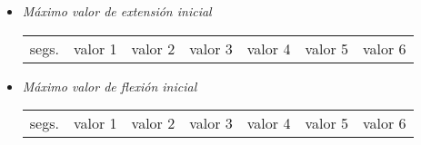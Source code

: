 \begin{itemize} [label=$ \rhd $]
\begin{itemize} [label= $  \triangleright $]
\begin{table}[H]
\begin{tabular}{ccccccc}
			\end{tabular} 
		\end{table}	
		\item \textit{Máximo valor de extensión inicial} \vspace{-6mm}
		\begin{table}[H]
			\hspace{2cm}
			\renewcommand{\arraystretch}{2}
			\begin{tabular}{ccccccc}
				segs.& valor 1 & valor 2 & valor 3 & valor 4 & valor 5 & valor 6  \\
			\end{tabular} 
		\end{table}	
		\item \textit{Máximo valor de flexión inicial} \vspace{-6mm}
		\begin{table}[H]
			\hspace{2cm}
			\renewcommand{\arraystretch}{2}
			\begin{tabular}{ccccccc}
				segs.& valor 1 & valor 2 & valor 3 & valor 4 & valor 5 & valor 6  \\
			\end{tabular} 
		\end{table}	
	\end{itemize}
	

\end{itemize}
